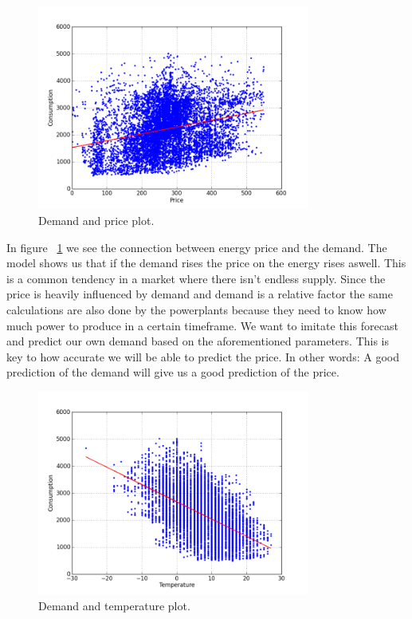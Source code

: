 \begin{figure}[H]
\centering
\includegraphics[width=0.8\textwidth ,natwidth=410,natheight=237]{billeder/energy_price_plots/consump_price.png}
\caption{Demand and price plot.}
\label{fig:consump_price}
\end{figure}

In figure ~\ref{fig:consump_price} we see the connection between energy price and the demand. The model shows us that if the demand rises the price on the energy rises aswell. This is a common tendency in a market where there isn't endless supply. Since the price is heavily influenced by demand and demand is a relative factor the same calculations are also done by the powerplants because they need to know how much power to produce in a certain timeframe. We want to imitate this forecast and predict our own demand based on the aforementioned parameters. This is key to how accurate we will be able to predict the price. In other words: A good prediction of the demand will give us a good prediction of the price.

\begin{figure}[H]
\centering
\includegraphics[width=0.8\textwidth ,natwidth=410,natheight=237]{billeder/energy_price_plots/consump_temp.png}
\caption{Demand and temperature plot.}
\label{fig:consump_temp}
\end{figure}


